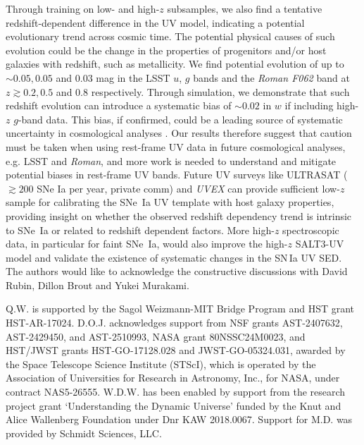 \documentclass[twocolumn,tighten,times,floatfix]{aastex631}
\begin{document}
Through training on low- and high-$z$ subsamples, we also find a tentative redshift-dependent difference in the UV model, indicating a potential evolutionary trend across cosmic time. The potential physical causes of such evolution could be the change in the properties of progenitors and/or host galaxies with redshift, such as metallicity. We find potential evolution of up to $\sim0.05, 0.05$ and $0.03$ mag in the LSST $u$, $g$ bands and the {\it Roman F062} band at $z\gtrsim0.2, 0.5$ and $0.8$ respectively. 
Through simulation, we demonstrate that such redshift evolution can introduce a systematic bias of $\sim0.02$ in $w$ if including high-$z$ $g$-band data. This bias, if confirmed, could be a leading source of systematic uncertainty in cosmological analyses \citep[e.g.,][]{Brout22,Abbott24sn}.
Our results therefore suggest that caution must be taken when using rest-frame UV data in future cosmological analyses, e.g. LSST and {\it Roman}, and more work is needed to understand and mitigate potential biases in rest-frame UV bands. Future UV surveys like ULTRASAT ($\gtrsim 200$ SNe Ia per year, private comm) and {\it UVEX} can provide sufficient low-$z$ sample for calibrating the SNe~Ia UV template with host galaxy properties, providing insight on whether the observed redshift dependency trend is intrinsic to SNe~Ia or related to redshift dependent factors. More high-$z$ spectroscopic data, in particular for faint SNe~Ia, would also improve the high-$z$ SALT3-UV model and validate the existence of systematic changes in the SN\,Ia UV SED.\\


The authors would like to acknowledge the constructive discussions with David Rubin, Dillon Brout and Yukei Murakami.

Q.W. is supported by the Sagol Weizmann-MIT Bridge Program and HST grant HST-AR-17024. 
D.O.J. acknowledges support from NSF grants AST-2407632, AST-2429450, and AST-2510993, NASA grant 80NSSC24M0023, and HST/JWST grants HST-GO-17128.028 and JWST-GO-05324.031, awarded by the Space Telescope Science Institute (STScI), which is operated by the Association of Universities for Research in Astronomy, Inc., for NASA, under contract NAS5-26555.
W.D.W. has been enabled by support from the research project grant ‘Understanding the Dynamic Universe’ funded by the Knut and Alice Wallenberg Foundation under Dnr KAW 2018.0067.
Support for M.D. was provided by Schmidt Sciences, LLC.
\end{document}
